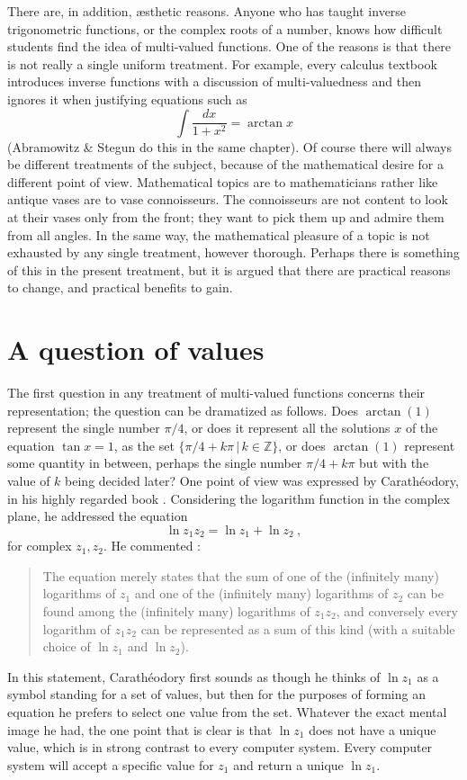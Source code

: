 \documentclass{article}
\newcommand{\Z}{\mathbb{Z}}
\begin{document}
There are, in addition, \ae sthetic reasons.
Anyone who has taught inverse trigonometric functions, or the complex roots of a number,
knows how difficult students find the idea of multi-valued functions.
One of the reasons is that there is not really a single uniform treatment.
For example, every calculus textbook introduces inverse functions with a discussion of
multi-valuedness and then ignores it when justifying equations such as
\[ \int \frac{dx}{1+x^2} = \arctan x  \]
(Abramowitz \& Stegun \cite{AandS:1965} do this in the same chapter).
Of course there will always be different treatments of the subject, because of
the mathematical desire for a different point of view.
Mathematical topics are to mathematicians rather like antique vases are to
vase connoisseurs.
The connoisseurs are not content to look at their vases only from the front;
they want to pick them up and admire them from all angles.
In the same way, the mathematical pleasure of a topic is not exhausted by any single
treatment, however thorough.
Perhaps there is something of this in the present treatment, but it is argued
that there are practical reasons to change, and practical benefits to gain.

\section{A question of values}

The first question in any treatment of multi-valued functions
concerns their representation; the question can be dramatized as follows.
Does $\arctan(1)$ represent the single number $\pi/4$, or does it represent all the solutions
$x$ of the equation $\tan x=1$, as the set $\{ \pi/4+k\pi\, |\, k\in \Z \}$,
or does $\arctan(1)$ represent some quantity in between,
perhaps the single number $\pi/4+k\pi$ but with the value of $k$ being decided later?
One point of view was expressed by Carath\'eodory, in his highly regarded
book \cite{Cara:1958}.
Considering the logarithm function in the complex plane, he addressed the equation
\begin{equation}\label{eq:logmult3}
\ln z_1z_2=\ln z_1 +\ln z_2\ ,
\end{equation}
for complex $z_1,z_2$.
He commented \cite[pp.~259--260]{Cara:1958}:
\begin{quote}
The equation merely states that
the sum of one of the (infinitely many) logarithms of $z_1$ and one of
the (infinitely many) logarithms of $z_2$ can be found among the
(infinitely many) logarithms of $z_1z_2$, and conversely every
logarithm of $z_1z_2$ can be represented as a sum of this kind (with a
suitable choice of $\ln z_1$ and $\ln z_2$).
\end{quote}
In this statement, Carath\'eodory first sounds as though he thinks of $\ln z_1$
as a symbol standing for a set of values,
but then for the purposes of forming an equation he prefers to select one value from the set.
Whatever the exact mental image he had, the one point that is clear is that $\ln z_1$
does not have a unique value,
which is in strong contrast to every computer system.
Every computer system will accept a specific value for $z_1$
and return a unique $\ln z_1$.
\end{document}

